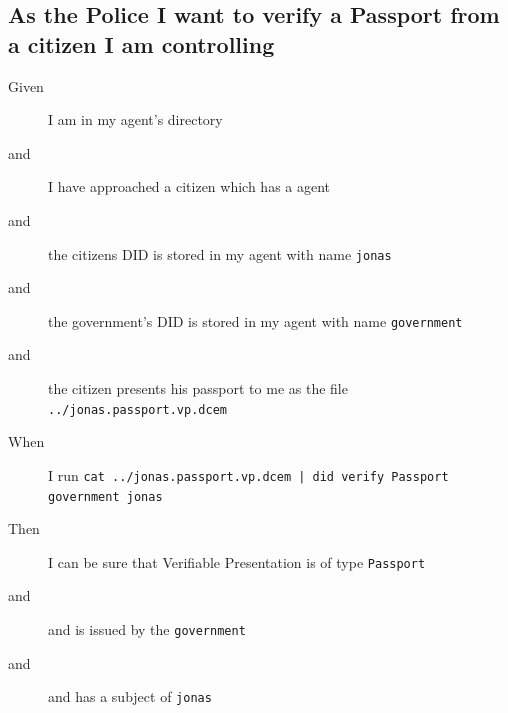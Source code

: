 \subsection{As the Police I want to verify a Passport from a citizen I am controlling}
\begin{description}
    \item[Given] I am in my agent's directory
    \item[and] I have approached a citizen which has a agent
    \item[and] the citizens DID is stored in my agent with name \texttt{jonas}
    \item[and] the government's DID is stored in my agent with name \texttt{government}
    \item[and] the citizen presents his passport to me as the file \texttt{../jonas.passport.vp.dcem}
    \item[When] I run \texttt{cat ../jonas.passport.vp.dcem | did verify Passport government jonas}
    \item[Then] I can be sure that Verifiable Presentation is of type \texttt{Passport}
    \item[and] and is issued by the \texttt{government}
    \item[and] and has a subject of \texttt{jonas}
\end{description}

